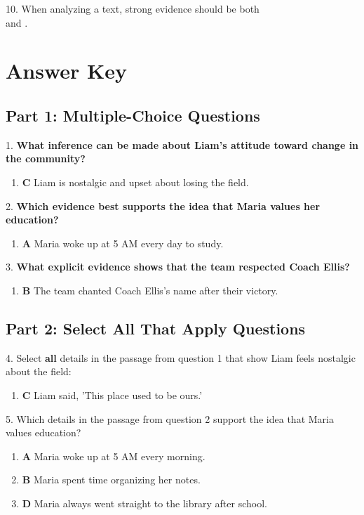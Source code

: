 \documentclass[12pt]{article}
\begin{document}
10. When analyzing a text, strong evidence should be both \\\underline{\hspace{4cm}} and \underline{\hspace{4cm}}.  
\vspace{2cm}
\newpage
\section*{Answer Key}

\subsection*{Part 1: Multiple-Choice Questions}

1. \textbf{What inference can be made about Liam’s attitude toward change in the community?}
\begin{enumerate}[label=\Alph*.]
    \item \textbf{C} Liam is nostalgic and upset about losing the field.
\end{enumerate}

2. \textbf{Which evidence best supports the idea that Maria values her education?}
\begin{enumerate}[label=\Alph*.]
    \item \textbf{A} Maria woke up at 5 AM every day to study.
\end{enumerate}

3. \textbf{What explicit evidence shows that the team respected Coach Ellis?}
\begin{enumerate}[label=\Alph*.]
    \item \textbf{B} The team chanted Coach Ellis's name after their victory.
\end{enumerate}

\subsection*{Part 2: Select All That Apply Questions}

4. Select \textbf{all} details in the passage from question 1 that show Liam feels nostalgic about the field:
\begin{enumerate}[label=\Alph*.]
    \item \textbf{C} Liam said, 'This place used to be ours.'
\end{enumerate}

5. Which details in the passage from question 2 support the idea that Maria values education?
\begin{enumerate}[label=\Alph*.]
    \item \textbf{A} Maria woke up at 5 AM every morning.
    \item \textbf{B} Maria spent time organizing her notes.
    \item \textbf{D} Maria always went straight to the library after school.
\end{enumerate}
\end{document}
